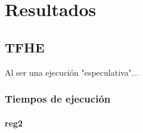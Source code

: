 \chapter{Resultados}
\label{chap:resultados}


\section{TFHE}

Al ser una ejecución "especulativa"...

\subsection{Tiempos de ejecución}

\subsubsection{reg2}
%



